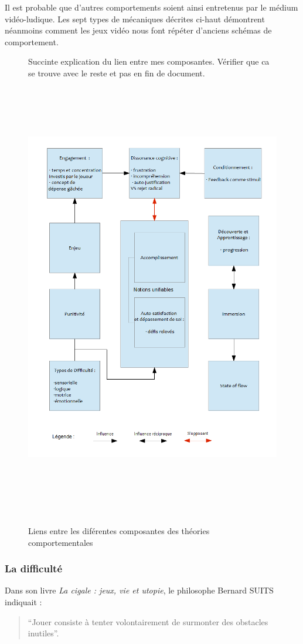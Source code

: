 Il est probable que d’autres comportements soient ainsi entretenus par le médium vidéo-ludique.
Les sept types de mécaniques décrites ci-haut démontrent néanmoins comment les jeux vidéo nous
font répéter d’anciens schémas de comportement.

\begin{figure}
Succinte explication du lien entre mes composantes. Vérifier que ca se trouve avec le reste et pas en fin de document.
	\centering
	\includegraphics[height=19.6cm]{images/lien_theories}
	\caption{Liens entre les diférentes composantes des théories comportementales}
	\label{lien_theories}
\end{figure}
		\subsubsection{La difficulté}
Dans son livre \emph{La cigale : jeux, vie et utopie}, le philosophe Bernard SUITS indiquait : \begin{quote}{“Jouer consiste à tenter volontairement de surmonter des obstacles inutiles”}.  \end{quote}
		
